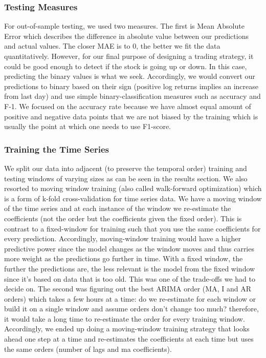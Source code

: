 \subsubsection{Testing Measures}
For out-of-sample testing, we used two measures. The first is Mean Absolute Error which describes the difference in absolute value between our predictions and actual values. The closer MAE is to 0, the better we fit the data quantitatively. However, for our final purpose of designing a trading strategy, it could be good enough to detect if the stock is going up or down. In this case, predicting the binary values is what we seek. Accordingly, we would convert our predictions to binary based on their sign (positive log returns implies an increase from last day) and use simple binary-classification measures such as accuracy and F-1. We focused on the accuracy rate because we have almost equal amount of positive and negative data points that we are not biased by the training which is usually the point at which one needs to use F1-score.
\subsubsection{Training the Time Series}
We split our data into adjacent (to preserve the temporal order) training and testing windows of varying sizes as can be seen in the results section. We also resorted to moving window training (also called walk-forward optimization) which is a form of k-fold cross-validation for time series data. We have a moving window of the time series and at each instance of the window we re-estimate the coefficients (not the order but the coefficients given the fixed order). This is contrast to a fixed-window for training such that you use the same coefficients for every prediction. Accordingly, moving-window training would have a higher predictive power since the model changes as the window moves and thus carries more weight as the predictions go further in time. With a fixed window, the further the predictions are, the less relevant is the model from the fixed window since it's based on data that is too old.
This was one of the trade-offs we had to decide on. The second was figuring out the best ARIMA order (MA, I and AR orders) which takes a few hours at a time: do we re-estimate for each window or build it on a single window and assume orders don't change too much? therefore, it would take a long time to re-estimate the order for every training window.
Accordingly, we ended up doing a moving-window training strategy that looks ahead one step at a time and re-estimates the coefficients at each time but uses the same orders (number of lags and ma coefficients).	

